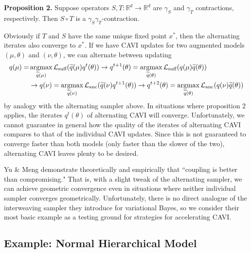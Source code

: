 \documentclass{article}
\begin{document}
{\bf Proposition 2.} Suppose operators $S,T:\mathbb R^d\to\mathbb R^d$ are $\gamma_S$ and $\gamma_T$ contractions, respectively. Then $S\circ T$ is a $\gamma_S\gamma_T$-contraction. %

Obviously if $T$ and $S$ have the same unique fixed point $x^*$, then the alternating iterates also converge to $x^*$. If we have CAVI updates for two augmented models $(\mu,\theta)$ and $(\nu,\theta)$, we can alternate between updating 
\begin{align*}
q(\mu) = &\mathop{\mathrm{argmax}}_{\widetilde q(\mu)} \mathcal L_\text{suff}(\widetilde q(\mu) q^t(\theta)) 
\to q^{t+1}(\theta) = \mathop{\mathrm{argmax}}_{\widetilde q(\theta)} \mathcal L_\text{suff}(q(\mu) \widetilde q(\theta)) \\
&\to q(\nu) = \mathop{\mathrm{argmax}}_{\widetilde q(\nu)} \mathcal L_\text{anc}(\widetilde q(\nu) q^{t+1}(\theta)) 
\to q^{t+2}(\theta) = \mathop{\mathrm{argmax}}_{\widetilde q(\theta)} \mathcal L_\text{anc}(q(\nu) \widetilde q(\theta)) 
\end{align*}
by analogy with the alternating sampler above. In situations where proposition 2 applies, the iterates $q^t(\theta)$ of alternating CAVI will converge. Unfortunately, we cannot guarantee in general how the quality of the iterates of alternating CAVI compares to that of the individual CAVI updates. Since this is not guaranteed to converge faster than both models (only faster than the slower of the two), alternating CAVI leaves plenty to be desired. 

Yu \& Meng \cite{Yu} demonstrate theoretically and empirically that ``coupling is better than compromising." That is, with a slight tweak of the alternating sampler, we can achieve geometric convergence even in situations where neither individual sampler converges geometrically. Unfortunately, there is no direct analogue of the interweaving sampler they introduce for variational Bayes, so we consider their most basic example as a testing ground for strategies for accelerating CAVI.

\subsection{Example: Normal Hierarchical Model} 
\end{document}
